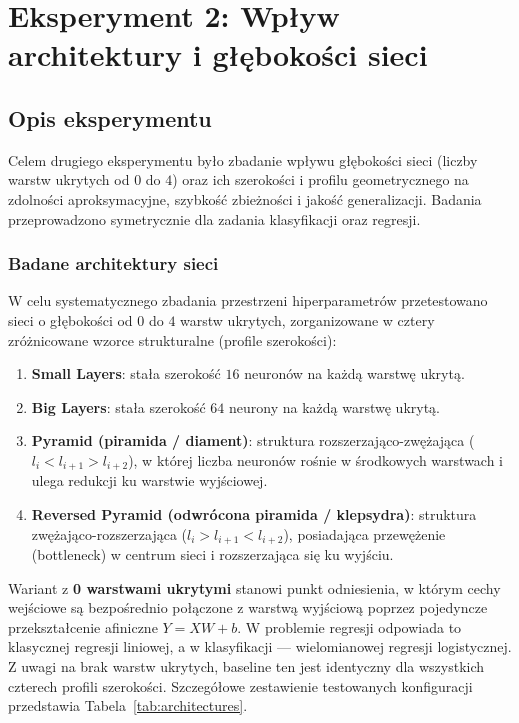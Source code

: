 \documentclass[11pt,a4paper]{article}
\begin{document}
\section{Eksperyment 2: Wpływ architektury i głębokości sieci}
\label{sec:exp_architecture}

\subsection{Opis eksperymentu}
Celem drugiego eksperymentu było zbadanie wpływu głębokości sieci (liczby warstw ukrytych od $0$ do $4$) oraz ich szerokości i profilu geometrycznego na zdolności aproksymacyjne, szybkość zbieżności i jakość generalizacji. Badania przeprowadzono symetrycznie dla zadania klasyfikacji oraz regresji.

\subsubsection{Badane architektury sieci}
W celu systematycznego zbadania przestrzeni hiperparametrów przetestowano sieci o głębokości od $0$ do $4$ warstw ukrytych, zorganizowane w cztery zróżnicowane wzorce strukturalne (profile szerokości):
\begin{enumerate}
    \item \textbf{Small Layers}: stała szerokość $16$ neuronów na każdą warstwę ukrytą.
    \item \textbf{Big Layers}: stała szerokość $64$ neurony na każdą warstwę ukrytą.
    \item \textbf{Pyramid (piramida / diament)}: struktura rozszerzająco-zwężająca ($l_i < l_{i+1} > l_{i+2}$), w której liczba neuronów rośnie w środkowych warstwach i ulega redukcji ku warstwie wyjściowej.
    \item \textbf{Reversed Pyramid (odwrócona piramida / klepsydra)}: struktura zwężająco-rozszerzająca ($l_i > l_{i+1} < l_{i+2}$), posiadająca przewężenie (bottleneck) w centrum sieci i rozszerzająca się ku wyjściu.
\end{enumerate}

\noindent Wariant z \textbf{0 warstwami ukrytymi} stanowi punkt odniesienia, w którym cechy wejściowe są bezpośrednio połączone z warstwą wyjściową poprzez pojedyncze przekształcenie afiniczne $Y = XW + b$. W problemie regresji odpowiada to klasycznej regresji liniowej, a w klasyfikacji — wielomianowej regresji logistycznej. Z uwagi na brak warstw ukrytych, baseline ten jest identyczny dla wszystkich czterech profili szerokości. Szczegółowe zestawienie testowanych konfiguracji przedstawia Tabela~\ref{tab:architectures}.
\end{document}
